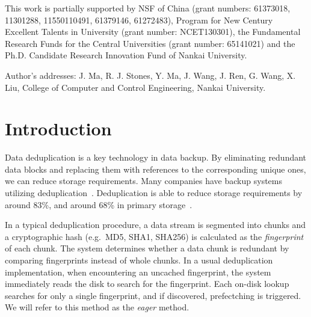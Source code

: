 \documentclass[prodmode,acmtecs]{acmsmall}
\begin{document}

%
%




\begin{bottomstuff}
This work is partially supported by NSF of China (grant numbers: 61373018, 11301288, 11550110491, 61379146, 61272483), Program for New Century Excellent Talents in University (grant number: NCET130301), the Fundamental Research Funds for the Central Universities (grant number: 65141021) and the Ph.D. Candidate Research Innovation Fund of Nankai University.

Author's addresses: J. Ma, R. J. Stones, Y. Ma, J. Wang, J. Ren, G. Wang, X. Liu, College of Computer and Control Engineering, Nankai University.
\end{bottomstuff}

\maketitle

\section{Introduction}

Data deduplication is a key technology in data backup. By eliminating redundant data blocks and replacing them with references to the corresponding unique ones, we can reduce storage requirements. Many companies have backup systems utilizing deduplication~\cite{Paulo2014survey,Meyer2012,quinlan2002venti,zhu2008avoiding,lin2015using}. Deduplication is able to reduce storage requirements by around 83\%, and around 68\% in primary storage~\cite{meyer2011study}.

In a typical deduplication procedure, a data stream is segmented into chunks and a cryptographic hash (e.g.\ MD5, SHA1, SHA256) is calculated as the \emph{fingerprint} of each chunk. The system determines whether a data chunk is redundant by comparing fingerprints instead of whole chunks.  In a usual deduplication implementation, when encountering an uncached fingerprint, the system immediately reads the disk to search for the fingerprint.  Each on-disk lookup searches for only a single fingerprint, and if discovered, prefectching is triggered.  We will refer to this method as the \emph{eager} method.
\end{document}
